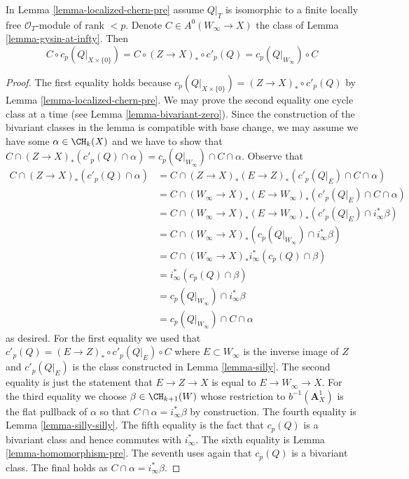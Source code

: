 \begin{lemma}
\label{lemma-homomorphism}
In Lemma \ref{lemma-localized-chern-pre} assume $Q|_T$ is isomorphic
to a finite locally free $\mathcal{O}_T$-module of rank $< p$.
Denote $C \in A^0(W_\infty \to X)$ the class of
Lemma \ref{lemma-gysin-at-infty}. Then
$$
C \circ c_p(Q|_{X \times \{0\}}) =
C \circ (Z \to X)_* \circ c'_p(Q) = c_p(Q|_{W_\infty}) \circ C
$$
\end{lemma}

\begin{proof}
The first equality holds because $c_p(Q|_{X \times \{0\}}) =
(Z \to X)_* \circ c'_p(Q)$ by Lemma \ref{lemma-localized-chern-pre}.
We may prove the second equality one cycle class at a time
(see Lemma \ref{lemma-bivariant-zero}). Since the construction of
the bivariant classes in the lemma is compatible with base change,
we may assume we have some $\alpha \in \CH_k(X)$ and we have to show that
$C \cap (Z \to X)_*(c'_p(Q) \cap \alpha) =
c_p(Q|_{W_\infty}) \cap C \cap \alpha$. Observe that
\begin{align*}
C \cap (Z \to X)_*(c'_p(Q) \cap \alpha)
& =
C \cap (Z \to X)_* (E \to Z)_*(c'_p(Q|_E) \cap C \cap \alpha) \\
& =
C \cap (W_\infty \to X)_*(E \to W_\infty)_*(c'_p(Q|_E) \cap C \cap \alpha) \\
& =
C \cap (W_\infty \to X)_*(E \to W_\infty)_*(c'_p(Q|_E) \cap i_\infty^*\beta) \\
& =
C \cap (W_\infty \to X)_*(c_p(Q|_{W_\infty}) \cap i_\infty^*\beta) \\
& =
C \cap (W_\infty \to X)_*i_\infty^*(c_p(Q) \cap \beta) \\
& =
i_\infty^*(c_p(Q) \cap \beta) \\
& =
c_p(Q|_{W_\infty}) \cap i_\infty^*\beta \\
& =
c_p(Q|_{W_\infty}) \cap C \cap \alpha
\end{align*}
as desired. For the first equality we used that
$c'_p(Q) = (E \to Z)_* \circ c'_p(Q|_E) \circ C$ where $E \subset W_\infty$
is the inverse image of $Z$ and $c'_p(Q|_E)$ is the class constructed
in Lemma \ref{lemma-silly}. The second equality is just the statement
that $E \to Z \to X$ is equal to $E \to W_\infty \to X$.
For the third equality we choose $\beta \in \CH_{k + 1}(W)$ whose restriction to
$b^{-1}(\mathbf{A}^1_X)$ is the flat pullback of $\alpha$ so that
$C \cap \alpha = i_\infty^*\beta$ by construction. The fourth equality is
Lemma \ref{lemma-silly-silly}. The fifth equality is the fact that
$c_p(Q)$ is a bivariant class and hence commutes with $i_\infty^*$.
The sixth equality is Lemma \ref{lemma-homomorphism-pre}.
The seventh uses again that $c_p(Q)$ is a bivariant class.
The final holds as $C \cap \alpha = i_\infty^*\beta$.
\end{proof}

